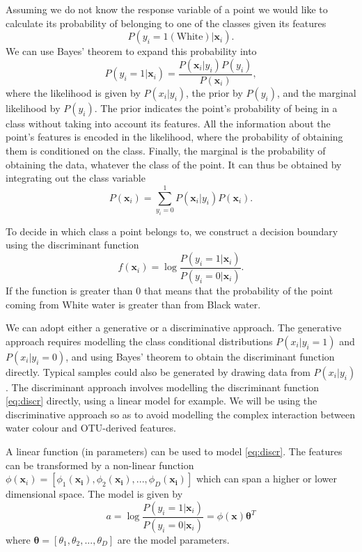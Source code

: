 Assuming we do not know the response variable of a point we would like to calculate its probability of belonging to one of the classes  given its features
\begin{equation}
	P(y_i = 1(\text{White})| \mathbf{x}_i).
\end{equation}  
We can use Bayes' theorem to expand this probability into
\begin{equation}
	P(y_i =1| \mathbf{x}_i) = \frac{P( \mathbf{x}_i|y_i)P(y_i)}{P( \mathbf{x}_i)},
\end{equation}
 where the likelihood is given by $P(x_i|y_i)$, the prior by $P(y_i)$, and the marginal likelihood by $P(y_i)$. The prior indicates the point's probability of being in a class without taking into account its features. All the information about the point's features is encoded in the likelihood, where the probability of obtaining them is conditioned on the class. Finally, the marginal is the probability of obtaining the data, whatever the class of the point. 
 It can thus  be obtained by integrating out the class variable
 \begin{equation}
 	P( \mathbf{x}_i) = \sum_{y_i =0}^{1} P( \mathbf{x}_i|y_i)P( \mathbf{x}_i).
 \end{equation} 

To decide in which class a point belongs to, we construct a decision boundary using the discriminant function
\begin{equation}
f( \mathbf{x}_i)=\log \frac{P(y_i=1 |  \mathbf{x}_i)}{P(y_i = 0 |  \mathbf{x}_i)}.
\label{eq:discr}
\end{equation}
If the function is greater than $0$ that means that the probability of the point coming from White water is greater than from Black water. 


We can adopt either a generative or a discriminative approach. The generative approach requires modelling the class conditional distributions $P(x_i|y_i = 1)$ and $P(x_i|y_i = 0)$, and using Bayes' theorem to obtain the discriminant function directly. Typical samples could also be generated by drawing data from $P(x_i|y_i)$. The discriminant approach involves modelling the discriminant function \eqref{eq:discr} directly, using a linear model for example. We will be using the discriminative approach so as to avoid modelling the complex interaction between water colour and OTU-derived features.


A linear function (in parameters) can be used to model \eqref{eq:discr}. The features can be transformed by a non-linear function $\phi( \mathbf{x}_i) = [\phi_1( \mathbf{x_i}),\phi_2( \mathbf{x_i}),...,\phi_D( \mathbf{x_i})]$ which can span a higher or lower dimensional space. The model is given by
\begin{equation}
	a = \log \frac{P(y_i=1 |  \mathbf{x}_i)}{P(y_i = 0 |  \mathbf{x}_i)} = \phi( \mathbf{x}) \bm{\theta}^T
\end{equation}
  where $ \bm{\theta} = [\theta_1,\theta_2,...,\theta_D]$ are the model parameters.
  
